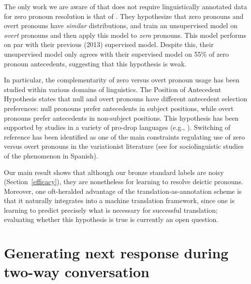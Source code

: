 \documentclass[11pt]{report}
\begin{document}
The only work we are aware of that does not require linguistically annotated data for zero pronoun resolution is that of \cite{chenchinese}. They hypothesize that zero pronouns and overt pronouns have \emph{similar} distributions, and train an unsupervised model on \emph{overt} pronouns and then apply this model to \emph{zero} pronouns. This model performs on par with their previous (2013) supervised model. Despite this, their unsupervised model only agrees with their supervised model on 55\% of zero pronoun antecedents, suggesting that this hypothesis is weak.


In particular, the complementarity of zero versus overt pronoun usage has been studied within various domains of linguistics. The Position of Antecedent Hypothesis \cite{carminati2002processing} states that null and overt pronouns have different antecedent selection preferences: null pronouns prefer antecedents in subject positions, while overt pronouns prefer antecedents in non-subject positions. This hypothesis has been supported by studies in a variety of pro-drop languages (e.g., \cite{alonso2002null} \cite{kweon2011processing}). Switching of reference has been identified as one of the main constraints regulating use of zero versus overt pronouns in the variationist literature (see \cite{cameron1992pronominal} for sociolinguistic studies of the phenomenon in Spanish).%

Our main result shows that although our bronze standard labels are noisy (Section~\ref{efficacy}), they are nonetheless for learning to resolve deictic pronouns. Moreover, one oft-heralded advantage of the translation-as-annotation scheme \cite{carpuat07psd} is that it naturally integrates into a machine translation framework, since one is learning to predict precisely what is necessary for successful translation; evaluating whether this hypothesis is true is currently an open question.


\newpage

\chapter{Generating next response during two-way conversation}
\end{document}
